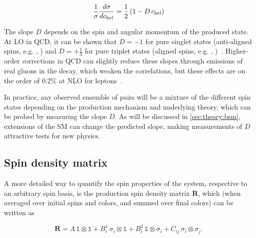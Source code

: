 \begin{equation}
\label{eq:theory:chel}
    \frac{1}{\sigma} \frac{d \sigma}{d c_{\mathrm{hel}}} = \frac{1}{2} \left( 1 - D \, c_{\mathrm{hel}} \right)
\end{equation}

The slope $D$ depends on the spin and angular momentum of the produced \ttbar state. At LO in QCD, it can be shown that $D=-1$ for pure singlet states (anti-aligned spins, e.g. , ) and $D=+\frac{1}{3}$ for pure triplet states (aligned spins, e.g. , )~\cite{Maltoni:2024tul}. Higher-order corrections in QCD can slightly reduce these slopes through emissions of real gluons in the decay, which weaken the correlations, but these effects are on the order of $0.2\%$ at NLO for leptons~\cite{Czarnecki:1990pe,Bernreuther:2003ga}. %

In practice, any observed ensemble of \ttbar pairs will be a mixture of the different spin states depending on the production mechanism and underlying theory, which can be probed by measuring the slope $D$. As will be discussed in \cref{sec:theory:bsm}, extensions of the SM can change the predicted slope, making measurements of $D$ attractive tests for new physics. 


\subsection{Spin density matrix}
\label{sec:theory:spindensity}

A more detailed way to quantify the spin properties of the \ttbar system, respective to an arbitrary spin basis, is the production spin density matrix $\mathbf{R}$, which (when averaged over initial spins and colors, and summed over final colors) can be written as~\cite{Maltoni:2024tul,Anuar:PhD}

\begin{equation}
    \mathbf{R} = A \, \mathbb{1} \otimes \mathbb{1}
    + B_i^1 \, \sigma_i \otimes \mathbb{1}
    + B_i^2 \, \mathbb{1} \otimes \sigma_i
    + C_{ij} \, \sigma_i \otimes \sigma_j.
\end{equation}

